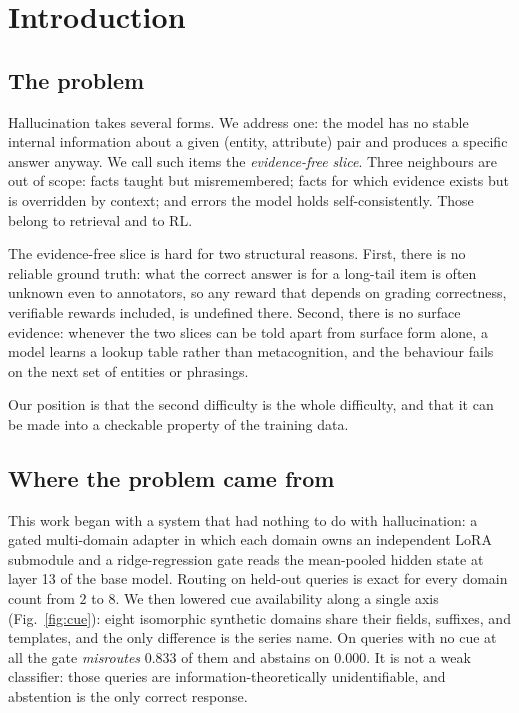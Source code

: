 \documentclass[11pt,a4paper]{article}
\begin{document}
\section{Introduction}
\label{sec:intro}

\subsection{The problem}

Hallucination takes several forms. We address one: the model has no stable
internal information about a given (entity, attribute) pair and produces a
specific answer anyway. We call such items the \emph{evidence-free slice}.
Three neighbours are out of scope: facts taught but misremembered; facts for
which evidence exists but is overridden by context; and errors the model holds
self-consistently. Those belong to retrieval and to RL.

The evidence-free slice is hard for two structural reasons. First, there is no
reliable ground truth: what the correct answer is for a long-tail item is often
unknown even to annotators, so any reward that depends on grading correctness,
verifiable rewards included, is undefined there. Second, there is no surface
evidence: whenever the two slices can be told apart from surface form alone, a
model learns a lookup table rather than metacognition, and the behaviour fails
on the next set of entities or phrasings.

Our position is that the second difficulty is the whole difficulty, and that it
can be made into a checkable property of the training data.

\subsection{Where the problem came from}

This work began with a system that had nothing to do with hallucination: a
gated multi-domain adapter in which each domain owns an independent LoRA
submodule and a ridge-regression gate reads the mean-pooled hidden state at
layer 13 of the base model. Routing on held-out queries is exact for every
domain count from $2$ to $8$. We then lowered cue availability along a single
axis (Fig.~\ref{fig:cue}): eight isomorphic synthetic domains share their
fields, suffixes, and templates, and the only difference is the series name. On
queries with no cue at all the gate \emph{misroutes} $0.833$ of them and
abstains on $0.000$. It is not a weak classifier: those queries are
information-theoretically unidentifiable, and abstention is the only correct
response.
\end{document}
